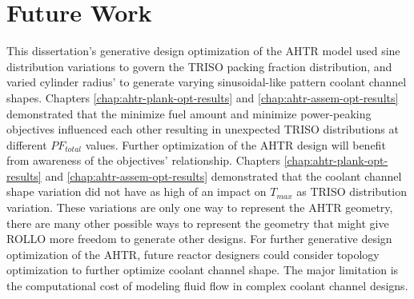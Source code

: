 \section{Future Work}
This dissertation's generative design optimization of the \gls{AHTR} model used sine 
distribution variations to govern the \gls{TRISO} packing fraction distribution, and  
varied cylinder radius' to generate varying sinusoidal-like pattern coolant channel 
shapes. 
Chapters \ref{chap:ahtr-plank-opt-results} and \ref{chap:ahtr-assem-opt-results} 
demonstrated that the minimize fuel amount and minimize power-peaking objectives 
influenced each other resulting in unexpected TRISO distributions at different 
$PF_{total}$ values.
Further optimization of the \gls{AHTR} design will benefit from awareness 
of the objectives' relationship. 
Chapters \ref{chap:ahtr-plank-opt-results} and \ref{chap:ahtr-assem-opt-results} 
demonstrated that the coolant channel shape variation did not have as high of an impact 
on $T_{max}$ as \gls{TRISO} distribution variation.
These variations are only one way to represent the \gls{AHTR} geometry, there are many 
other possible ways to represent the geometry that might give \gls{ROLLO} more freedom 
to generate other designs. 
For further generative design optimization of the \gls{AHTR}, future reactor designers 
could consider topology optimization to further optimize coolant channel shape. 
The major limitation is the computational cost of modeling fluid flow in complex 
coolant channel designs. 







